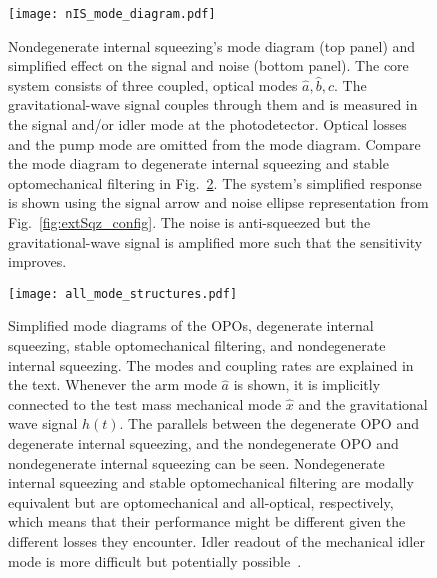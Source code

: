 \begin{figure}
    \centering
    \texttt{[image: nIS\_mode\_diagram.pdf]}
    \caption{Nondegenerate internal squeezing's mode diagram (top panel) and simplified effect on the signal and noise (bottom panel). The core system consists of three coupled, optical modes $\hat a,\hat b,\hat c$. The gravitational-wave signal couples through them and is measured in the signal and/or idler mode at the photodetector. Optical losses and the pump mode are omitted from the mode diagram. Compare the mode diagram to degenerate internal squeezing and stable optomechanical filtering in Fig.~\ref{fig:mode_diagram}. The system's simplified response is shown using the signal arrow and noise ellipse representation from Fig.~\ref{fig:extSqz_config}. The noise is anti-squeezed but the gravitational-wave signal is amplified more such that the sensitivity improves.}
    \label{fig:nIS_mode_diagram}
\end{figure}
\begin{figure}
    \centering
    \texttt{[image: all\_mode\_structures.pdf]}
    \caption{Simplified mode diagrams of the OPOs, degenerate internal squeezing, stable optomechanical filtering, and nondegenerate internal squeezing. The modes and coupling rates are explained in the text. Whenever the arm mode $\hat a$ is shown, it is implicitly connected to the test mass mechanical mode $\hat x$ and the gravitational wave signal $h(t)$. The parallels between the degenerate OPO and degenerate internal squeezing, and the nondegenerate OPO and nondegenerate internal squeezing can be seen. Nondegenerate internal squeezing and stable optomechanical filtering are modally equivalent but are optomechanical and all-optical, respectively, which means that their performance might be different given the different losses they encounter. Idler readout of the mechanical idler mode is more difficult but potentially possible~\cite{liEnhancingInterferometerSensitivity2021}.}
    \label{fig:mode_diagram}
\end{figure}

